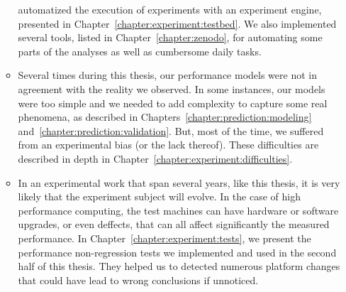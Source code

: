 \begin{itemize}
\begin{itemize}
                        automatized the execution of experiments with an experiment engine, presented in
                        Chapter~\ref{chapter:experiment:testbed}. We also implemented several tools, listed in
                        Chapter~\ref{chapter:zenodo}, for automating some parts of the analyses as well as cumbersome
                        daily tasks.
                    \item Several times during this thesis, our performance models were not in agreement with the
                        reality we observed. In some instances, our models were too simple and we needed to add
                        complexity to capture some real phenomena, as described in
                        Chapters~\ref{chapter:prediction:modeling} and~\ref{chapter:prediction:validation}. But, most of
                        the time, we suffered from an experimental bias (or the lack thereof). These difficulties are
                        described in depth in Chapter~\ref{chapter:experiment:difficulties}.
                    \item In an experimental work that span several years, like this thesis, it is very likely that the
                        experiment subject will evolve. In the case of high performance computing, the test machines can
                        have hardware or software upgrades, or even deffects, that can all affect significantly the
                        measured performance. In Chapter~\ref{chapter:experiment:tests}, we present the performance
                        non-regression tests we implemented and used in the second half of this thesis. They helped us
                        to detected numerous platform changes that could have lead to wrong conclusions if unnoticed.
                \end{itemize}
        \end{itemize}


